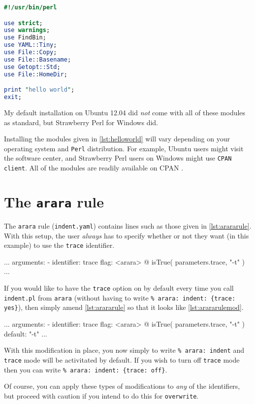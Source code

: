 \begin{lstlisting}[language=Perl,caption={\lstinline!helloworld.pl!},label={lst:helloworld}]
#!/usr/bin/perl

use strict;
use warnings;           
use FindBin;            
use YAML::Tiny;         
use File::Copy;         
use File::Basename;     
use Getopt::Std;        
use File::HomeDir;      

print "hello world";
exit;
\end{lstlisting}
My default installation on Ubuntu 12.04 did \emph{not} come
with all of these modules as standard, but Strawberry Perl for Windows \cite{strawberryperl}
did.
	
Installing the modules given in \cref{lst:helloworld} will vary depending on your 
operating system and \lstinline!Perl! distribution. For example, Ubuntu users 
might visit the software center, and Strawberry Perl users on Windows might use 
\lstinline!CPAN client!. All of the modules are readily available on CPAN \cite{cpan}.

\section{The \lstinline!arara! rule}
The \lstinline!arara! rule (\lstinline!indent.yaml!) contains lines such as those
given in \cref{lst:arararule}. With this setup, the user \emph{always} has 
to specify whether or not they want (in this example) to use the \lstinline!trace!
identifier.
\begin{yaml}[caption={The \lstinline!arara! rule},label={lst:arararule},numbers=none]
...
arguments:
- identifier: trace
  flag: <arara> @{ isTrue( parameters.trace, "-t" ) }
...
\end{yaml}

If you would like to have the \lstinline!trace! option on by default every time you 
call \lstinline!indent.pl! from \lstinline!arara! (without having to write \lstinline!% arara: indent: {trace: yes}!), then simply
amend \cref{lst:arararule} so that it looks like \cref{lst:arararulemod}.
\begin{yaml}[caption={The \lstinline!arara! rule (modified)},label={lst:arararulemod},numbers=none]
...
arguments:
- identifier: trace
  flag: <arara> @{ isTrue( parameters.trace, "-t" ) }
  default: "-t"
...
\end{yaml}

With this modification in place, you now simply to write \lstinline!% arara: indent! and 
\lstinline!trace! mode will be activitated by default. If you wish to turn off \lstinline!trace!
mode then you can write \lstinline!% arara: indent: {trace: off}!.

Of course, you can apply these types of modifications to \emph{any} of the identifiers, 
but proceed with caution if you intend to do this for \lstinline!overwrite!.

      

